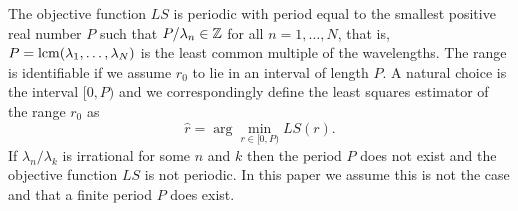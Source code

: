 \documentclass[10pt,twocolumn,twoside]{IEEEtran}
\begin{document}
The objective function $LS$ is periodic with period equal to the smallest positive real number $P$ such that $P/\lambda_n \in {\mathbb Z}$ for all $n=1,\dots,N$, that is, $P = \operatorname{lcm}(\lambda_1,\dots,\lambda_N)$ is the least common multiple of the wavelengths.  The range is identifiable if we assume $r_0$ to lie in an interval of length $P$.  A natural choice is the interval $[0,P)$ and we correspondingly define the least squares estimator of the range $r_0$ as
\begin{equation}\label{eq:hatdininterval}
\hat{r} = \arg\min_{r \in [0,P)} LS(r).
\end{equation}
If $\lambda_n/\lambda_k$ is irrational for some $n$ and $k$ then the period $P$ does not exist and the objective function $LS$ is not periodic.  In this paper we assume this is not the case and that a finite period $P$ does exist.

\end{document}
